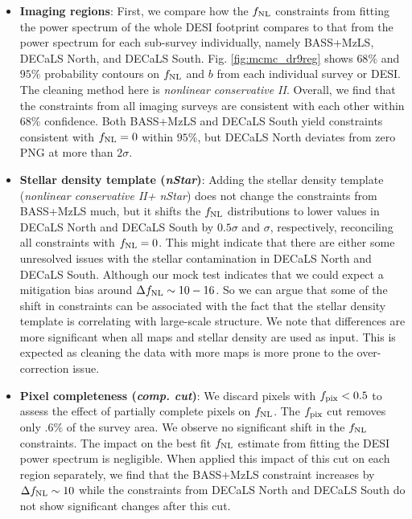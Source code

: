 \begin{itemize}
\item \textbf{Imaging regions}: First, we compare how the $f_{\rm NL}$ constraints from fitting the power spectrum of the whole DESI footprint compares to that from the power spectrum for each sub-survey individually, namely BASS+MzLS, DECaLS North, and DECaLS South. Fig. \ref{fig:mcmc_dr9reg} shows $68\%$ and $95\%$ probability contours on $f_{\rm NL}$ and $b$ from each individual survey or DESI. The cleaning method here is \textit{nonlinear conservative II}. Overall, we find that the constraints from all imaging surveys are consistent with each other within $68\%$ confidence. Both BASS+MzLS and DECaLS South yield constraints consistent with $f_{\rm NL}=0$ within $95\%$, but DECaLS North deviates from zero PNG at more than $2\sigma$. 

\item \textbf{Stellar density template (\textit{nStar})}: Adding the stellar density template (\textit{nonlinear conservative II+ nStar}) does not change the constraints from BASS+MzLS much, but it shifts the $f_{\rm NL}$ distributions to lower values in DECaLS North and DECaLS South by $0.5\sigma$ and $\sigma$, respectively, reconciling all constraints with $f_{\rm NL}=0$. This might indicate that there are either some unresolved issues with the stellar contamination in DECaLS North and DECaLS South. Although our mock test indicates that we could expect a mitigation bias around $\Delta f_{\rm NL} \sim 10-16$. So we can argue that some of the shift in constraints can be associated with the fact that the stellar density template is correlating with large-scale structure. We note that differences are more significant when all maps and stellar density are used as input. This is expected as cleaning the data with more maps is more prone to the over-correction issue.

\item \textbf{Pixel completeness (\textit{comp. cut})}: We discard pixels with $f_{\rm pix} < 0.5$ to assess the effect of partially complete pixels on $f_{\rm NL}$. The $f_{\rm pix}$ cut removes only $.6\%$ of the survey area. We observe no significant shift in the $f_{\rm NL}$ constraints. The impact on the best fit $f_{\rm NL}$ estimate from fitting the DESI power spectrum is negligible. When applied this impact of this cut on each region separately, we find that the BASS+MzLS constraint increases by $\Delta f_{\rm NL} \sim 10$ while the constraints from DECaLS North and DECaLS South do not show significant changes after this cut.


\end{itemize}
